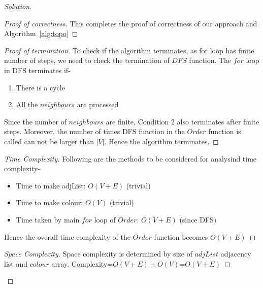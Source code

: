 \begin{solution}{2.1}
\begin{proof}[Solution]
\begin{proof}[Proof of correctness]
            This completes the proof of correctness of our approach and Algorithm~\ref{alg:topo}
        \end{proof}
        \begin{proof}[Proof of termination]
            To check if the algorithm terminates, as for loop has finite number of steps, we need to check the termination of $DFS$ function. The $for$ loop in DFS terminates if-
            \begin{enumerate}
                \item There is a cycle
                \item All the $neighbours$ are processed
            \end{enumerate}
            Since the number of $neighbours$ are finite, Condition 2 also terminates after finite steps.
            Moreover, the number of times DFS function in the $Order$ function is called can not be larger than $|V|$. Hence the algorithm terminates.
        \end{proof}
        \begin{proof}[Time Complexity]
        Following are the methods to be considered for analysind time complexity-
            \begin{itemize}
                \item Time to make adjList: $O(V+E)$ (trivial)
                \item Time to make colour: $O(V)$ (trivial)
                \item Time taken by main $for$ loop of $Order$:
                $O(V+E)$ (since DFS)
            \end{itemize}
            Hence the overall time complexity of the $Order$ function becomes $O(V+E)$
        \end{proof}
        \begin{proof}[Space Complexity]
            Space complexity is determined by size of $adjList$ adjacency list and $colour$ array.
            Complexity=$O(V+E)+O(V)$=$O(V+E)$
        \end{proof} 
    \end{proof}
\end{solution}
